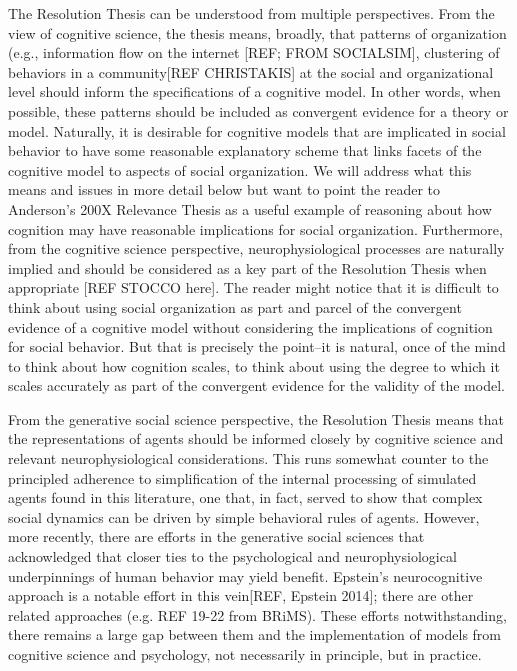 \documentclass{article}
\begin{document}
The Resolution Thesis can be understood from multiple perspectives.  From the view of cognitive science, the thesis means, broadly, that patterns of organization (e.g., information flow on the internet [REF; FROM SOCIALSIM], clustering of behaviors in a community[REF CHRISTAKIS] at the social and organizational level should inform the specifications of a cognitive model.  In other words, when possible, these patterns should be included as convergent evidence for a theory or model.  Naturally, it is desirable for cognitive models that are implicated in social behavior to have some reasonable explanatory scheme that links facets of the cognitive model to aspects of social organization.   We will address what this means and issues in more detail below but want to point the reader to Anderson's 200X Relevance Thesis as a useful example of reasoning about how cognition may have reasonable implications for social organization.   Furthermore, from the cognitive science perspective, neurophysiological processes are naturally implied and should be considered as a key part of the Resolution Thesis when appropriate [REF STOCCO here].  The reader might notice that it is difficult to think about using social organization as part and parcel of the convergent evidence of a cognitive model without considering the implications of cognition for social behavior.  But that is precisely the point--it is natural, once of the mind to think about how cognition scales, to think about using the degree to which it scales accurately as part of the convergent evidence for the validity of the model.


From the generative social science perspective, the Resolution Thesis means that the representations of agents should be informed closely by cognitive science and relevant neurophysiological considerations.  This runs somewhat counter to the principled adherence to simplification of the internal processing of simulated agents found in this literature, one that, in fact, served to show that complex social dynamics can be driven by simple behavioral rules of agents.  However, more recently, there are efforts in the generative social sciences that acknowledged that closer ties to the psychological and neurophysiological underpinnings of human behavior may yield benefit.  Epstein's neurocognitive approach is a notable effort in this vein[REF, Epstein 2014]; there are other related approaches (e.g. REF 19-22 from BRiMS).  These efforts notwithstanding, there remains a large gap between them and the implementation of models from cognitive science and psychology, not necessarily in principle, but in practice.  
\end{document}
